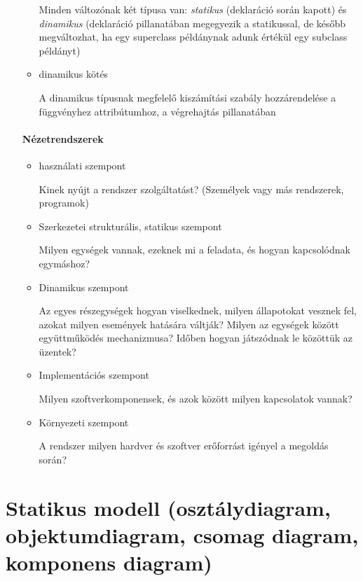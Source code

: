 \documentclass[margin=0px]{article}
\begin{document}
\begin{itemize}
\begin{itemize}
                    Minden változónak két típusa van: \textit{statikus} (deklaráció során kapott) és \textit{dinamikus} (deklaráció pillanatában megegyezik a statikussal, de később megváltozhat, ha egy superclass példánynak adunk értékül egy subclass példányt)
              \item dinamikus kötés

                    A dinamikus típusnak megfelelő kiszámítási szabály hozzárendelése a függvényhez attribútumhoz, a végrehajtás pillanatában
          \end{itemize}
          \paragraph{Nézetrendszerek}
          \begin{itemize}
              \item használati szempont

                    Kinek nyújt a rendszer szolgáltatást? (Személyek vagy más rendszerek, programok)

              \item Szerkezetei strukturális, statikus szempont

                    Milyen egységek vannak, ezeknek mi a feladata, és hogyan kapcsolódnak egymáshoz?

              \item Dinamikus szempont

                    Az egyes részegységek hogyan viselkednek, milyen állapotokat vesznek fel, azokat milyen események hatására váltják? Milyen az egységek között együttműködés mechanizmusa? Időben hogyan játszódnak le közöttük az üzentek?

              \item Implementációs szempont

                    Milyen szoftverkomponensek, és azok között milyen kapcsolatok vannak?

              \item Környezeti szempont

                    A rendszer milyen hardver és szoftver erőforrást igényel a megoldás során?
          \end{itemize}
\end{itemize}
\section{Statikus modell (osztálydiagram, objektumdiagram, csomag diagram, komponens diagram)}
\end{document}
